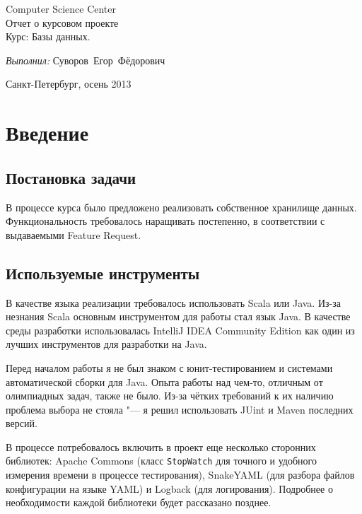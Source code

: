 \documentclass[a4paper]{article}
\renewcommand{\t}{\texttt}
\begin{document}
\begin{center}
  {\large Computer Science Center \\[3cm] }
  \huge Отчет о курсовом проекте \\[0.6cm] 
  \large Курс: Базы данных. \\[3.7cm]
  \begin{flushright} \begin{minipage}{0.6\textwidth}
    \emph{Выполнил:} Суворов~Егор~Фёдорович\\
  \end{minipage} \end{flushright}
  \vfill {\large Санкт-Петербург, осень 2013}
\end{center}
\thispagestyle{empty}
\clearpage
\setcounter{page}{1}

  \cfoot{}

\section{Введение}
\subsection{Постановка задачи}
  В процессе курса было предложено реализовать собственное хранилище данных.
  Функциональность требовалось наращивать постепенно, в соответствии с выдаваемыми
  Feature Request.
  
\subsection{Используемые инструменты}
  В качестве языка реализации требовалось использовать Scala или Java. Из-за незнания
  Scala основным инструментом для работы стал язык Java. В качестве среды разработки
  использовалась IntelliJ IDEA Community Edition как один из лучших инструментов для
  разработки на Java.

  Перед началом работы я не был знаком с юнит-тестированием и системами автоматической сборки
  для Java. Опыта работы над чем-то, отличным от олимпиадных задач, также не было.
  Из-за чётких требований к их наличию проблема выбора не стояла "--- я решил использовать
  JUint и Maven последних версий.

  В процессе потребовалось включить в проект еще несколько сторонних библиотек: Apache Commons
  (класс \t{StopWatch} для точного и удобного измерения времени в процессе тестирования), SnakeYAML (для разбора
  файлов конфигурации на языке YAML) и Logback (для логирования). Подробнее о необходимости
  каждой библиотеки будет рассказано позднее.
\end{document}

